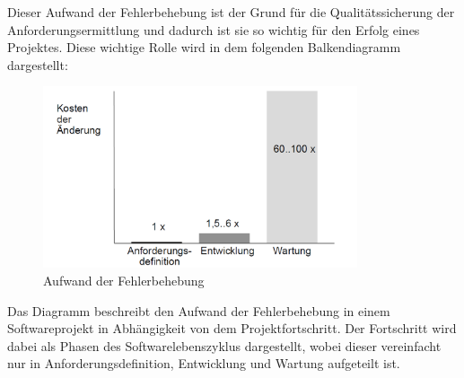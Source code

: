 \documentclass [12pt, a4paper, oneside, titlepage, ngerman]{article}
\begin{document}
\noindent Dieser Aufwand der Fehlerbehebung ist der Grund für die Qualitätssicherung der Anforderungsermittlung und dadurch ist sie so wichtig für den Erfolg eines Projektes. Diese wichtige Rolle wird in dem folgenden Balkendiagramm dargestellt:
\begin{figure}[H]
	\hspace{-2cm}
	\centering
	\includegraphics[width=350px,keepaspectratio]{TUDresden.png}
	\caption{Aufwand der Fehlerbehebung}
	\label{img:TUDresden}
\end{figure}
\noindent Das Diagramm beschreibt den Aufwand der Fehlerbehebung in einem Softwareprojekt in Abhängigkeit von dem Projektfortschritt. Der Fortschritt wird dabei als Phasen des Softwarelebenszyklus dargestellt, wobei dieser vereinfacht nur in Anforderungsdefinition, Entwicklung und Wartung aufgeteilt ist. \\
\end{document}
